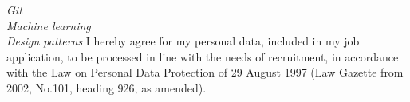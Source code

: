 \documentclass[10pt]{article} %
\begin{document}

{
\textit{Git}\\
\textit{Machine learning}\\
\textit{Design patterns}
}
\tiny{
I hereby agree for my personal data, included in my job application, to be processed in line with the needs of recruitment, in accordance with the Law on Personal Data Protection of 29 August 1997 (Law Gazette from 2002, No.101, heading 926, as amended).
}
\end{document}

